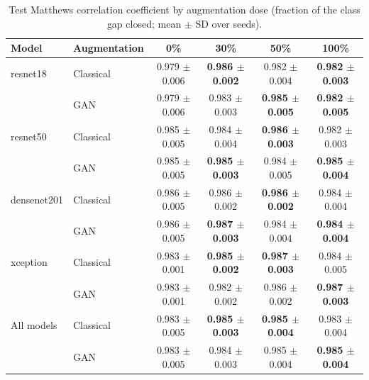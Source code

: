 \begin{table}[htbp]
\centering
\caption{Test Matthews correlation coefficient by augmentation dose (fraction of the class gap closed; mean $\pm$ SD over seeds).}
\label{tab:dose_mcc}
\begin{tabular}{llcccc}
\toprule
Model & Augmentation & 0\% & 30\% & 50\% & 100\% \\
\midrule
resnet18 & Classical & 0.979 $\pm$ 0.006 & \textbf{0.986 $\pm$ 0.002} & 0.982 $\pm$ 0.004 & \textbf{0.982 $\pm$ 0.003} \\
 & GAN & 0.979 $\pm$ 0.006 & 0.983 $\pm$ 0.003 & \textbf{0.985 $\pm$ 0.005} & \textbf{0.982 $\pm$ 0.005} \\
\addlinespace
resnet50 & Classical & 0.985 $\pm$ 0.005 & 0.984 $\pm$ 0.004 & \textbf{0.986 $\pm$ 0.003} & 0.982 $\pm$ 0.003 \\
 & GAN & 0.985 $\pm$ 0.005 & \textbf{0.985 $\pm$ 0.003} & 0.984 $\pm$ 0.005 & \textbf{0.985 $\pm$ 0.004} \\
\addlinespace
densenet201 & Classical & 0.986 $\pm$ 0.005 & 0.986 $\pm$ 0.002 & \textbf{0.986 $\pm$ 0.002} & 0.984 $\pm$ 0.004 \\
 & GAN & 0.986 $\pm$ 0.005 & \textbf{0.987 $\pm$ 0.003} & 0.984 $\pm$ 0.004 & \textbf{0.984 $\pm$ 0.004} \\
\addlinespace
xception & Classical & 0.983 $\pm$ 0.001 & \textbf{0.985 $\pm$ 0.002} & \textbf{0.987 $\pm$ 0.003} & 0.984 $\pm$ 0.005 \\
 & GAN & 0.983 $\pm$ 0.001 & 0.982 $\pm$ 0.002 & 0.986 $\pm$ 0.002 & \textbf{0.987 $\pm$ 0.003} \\
\addlinespace
All models & Classical & 0.983 $\pm$ 0.005 & \textbf{0.985 $\pm$ 0.003} & \textbf{0.985 $\pm$ 0.004} & 0.983 $\pm$ 0.004 \\
 & GAN & 0.983 $\pm$ 0.005 & 0.984 $\pm$ 0.003 & 0.985 $\pm$ 0.004 & \textbf{0.985 $\pm$ 0.004} \\
\bottomrule
\end{tabular}
\end{table}